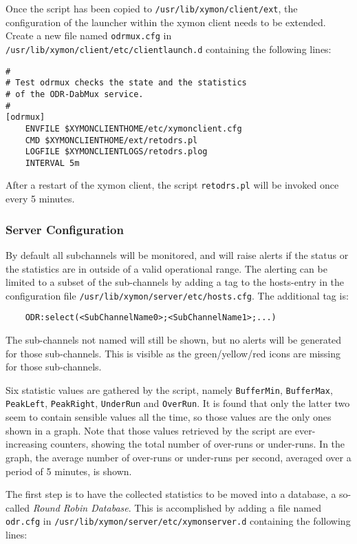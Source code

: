 Once the script has been copied to \verb+/usr/lib/xymon/client/ext+, the
configuration of the launcher within the xymon client needs to be extended.
Create a new file named \verb+odrmux.cfg+ in
\verb+/usr/lib/xymon/client/etc/clientlaunch.d+ containing the following lines:

\begin{verbatim}
#
# Test odrmux checks the state and the statistics
# of the ODR-DabMux service.
#
[odrmux]
	ENVFILE $XYMONCLIENTHOME/etc/xymonclient.cfg
	CMD $XYMONCLIENTHOME/ext/retodrs.pl
	LOGFILE $XYMONCLIENTLOGS/retodrs.plog
	INTERVAL 5m
\end{verbatim}

After a restart of the xymon client, the script \verb+retodrs.pl+ will
be invoked once every 5 minutes.


\subsubsection{Server Configuration}

By default all subchannels will be monitored, and will raise alerts if the
status or the statistics are in outside of a valid operational range. The
alerting can be limited to a subset of the sub-channels by adding a tag to the
hosts-entry in the configuration file \verb+/usr/lib/xymon/server/etc/hosts.cfg+.
The additional tag is:

\begin{verbatim}
	ODR:select(<SubChannelName0>;<SubChannelName1>;...)
\end{verbatim}

The sub-channels not named will still be shown, but no alerts will be generated
for those sub-channels. This is visible as the green/yellow/red icons are
missing for those sub-channels.

Six statistic values are gathered by the script, namely
\texttt{BufferMin}, \texttt{BufferMax}, \texttt{PeakLeft}, \texttt{PeakRight},
\texttt{UnderRun} and \texttt{OverRun}. It is found that only the latter two
seem to contain sensible values all the time, so those values are the only
ones shown in a graph. Note that those values retrieved by the script are
ever-increasing counters, showing the total number of over-runs or under-runs.
In the graph, the average number of over-runs or under-runs per second, averaged
over a period of 5 minutes, is shown.

The first step is to have the collected statistics to be moved into a database,
a so-called \textit{Round Robin Database}. This is accomplished by adding a file
named \verb+odr.cfg+ in \verb+/usr/lib/xymon/server/etc/xymonserver.d+
containing the following lines:


